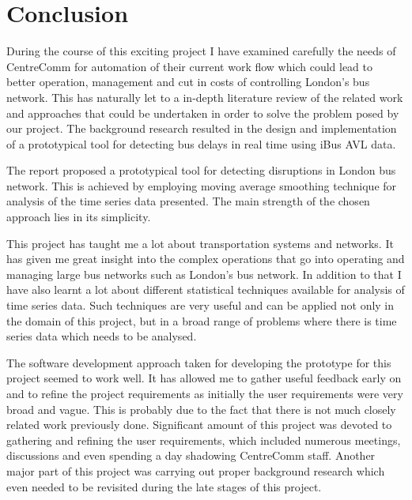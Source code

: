 \chapter{Conclusion}
During the course of this exciting project I have examined carefully the needs of CentreComm for automation of their current work flow which could lead to better operation, management and cut in costs of controlling London's bus network. This has naturally let to a in-depth literature review of the related work and approaches that could be undertaken in order to solve the problem posed by our project. The background research resulted in the design and implementation of a prototypical tool for detecting bus delays in real time using iBus AVL data.

The report proposed a prototypical tool for detecting disruptions in London bus network. This is achieved by employing moving average smoothing technique for analysis of the time series data presented. The main strength of the chosen approach lies in its simplicity. 


This project has taught me a lot about transportation systems and networks. It has given me great insight into the complex operations that go into operating and managing large bus networks such as London's bus network. In addition to that I have also learnt a lot about different statistical techniques available for analysis of time series data. Such techniques are very useful and can be applied not only in the domain of this project, but in a broad range of problems where there is time series data which needs to be analysed. 

The software development approach taken for developing the prototype for this project seemed to work well. It has allowed me to gather useful feedback early on and to refine the project requirements as initially the user requirements were very broad and vague. This is probably due to the fact that there is not much closely related work previously done. Significant amount of this project was devoted to gathering and refining the user requirements, which included numerous meetings, discussions and even spending a day shadowing CentreComm staff. Another major part of this project was carrying out proper background research which even needed to be revisited during the late stages of this project. 

